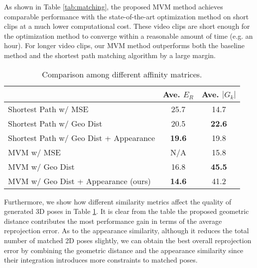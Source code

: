 \documentclass{article}
\begin{document}
As shown in Table \ref{tab:matching}, the proposed MVM method achieves
comparable performance with the state-of-the-art optimization method
\cite{dong2019fast} on short clips at a much lower computational cost.
These video clips are short enough for the optimization method to
converge within a reasonable amount of time (e.g. an hour). For longer
video clips, our MVM method outperforms both the baseline method and
the shortest path matching algorithm by a large margin. 

\begin{table}[htb]
\centering
\begin{tabular}{l|cc} \hline \hline
& Ave. $E_R$ & Ave. $|G_k|$ \\ \hline \hline
Shortest Path w/ MSE & 25.7 & 14.7 \\
Shortest Path w/ Geo Dist & 20.5 & \textbf{22.6} \\
Shortest Path w/ Geo Dist + Appearance & \textbf{19.6} & 19.8 \\ \hline
MVM w/ MSE & N/A & 15.8 \\
MVM w/ Geo Dist & 16.8 & \textbf{45.5} \\
MVM w/ Geo Dist + Appearance (ours) & \textbf{14.6} & 41.2 \\ \hline \hline
\end{tabular}
\caption{Comparison among different affinity matrices.}
\label{tab:sim}
\end{table}


Furthermore, we show how different similarity metrics affect the quality
of generated 3D poses in Table \ref{tab:sim}. It is clear from the table
the proposed geometric distance contributes the most performance gain in
terms of the average reprojection error. As to the appearance
similarity, although it reduces the total number of matched 2D poses
slightly, we can obtain the best overall reprojection error by combining
the geometric distance and the appearance similarity since their
integration introduces more constraints to matched poses. 
\end{document}
